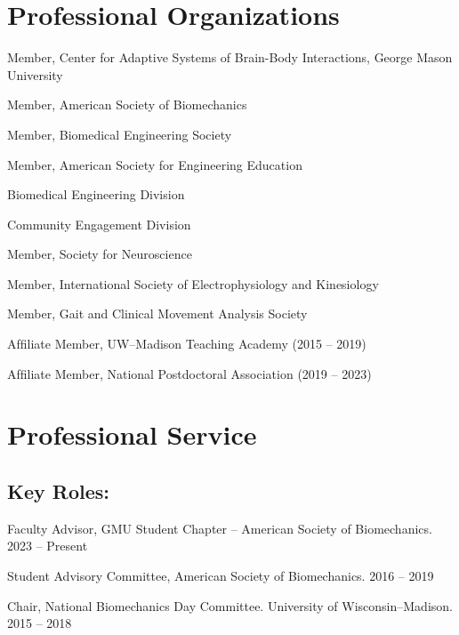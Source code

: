 \documentclass[letterpaper, 10pt]{article}
\begin{document}
\section{Professional Organizations}

\begin{compactitem} %
     \item Member, Center for Adaptive Systems of Brain-Body Interactions, George Mason University %
     \item Member, American Society of Biomechanics %
     \item Member, Biomedical Engineering Society %
     \item Member, American Society for Engineering Education %
          \begin{compactitem}
               \item Biomedical Engineering Division
               \item Community Engagement Division
          \end{compactitem}     
     \item Member, Society for Neuroscience %
     \item Member, International Society of Electrophysiology and Kinesiology %
     \item Member, Gait and Clinical Movement Analysis Society %
     \item Afﬁliate Member, UW--Madison Teaching Academy (2015 -- 2019)
     \item Afﬁliate Member, National Postdoctoral Association (2019 -- 2023)
\end{compactitem} %

\section{Professional Service}

\subsection{Key Roles:}
\begin{compactitem}
    \item Faculty Advisor, GMU Student Chapter -- American Society of Biomechanics. \hfill 2023 -- Present
    \item Student Advisory Committee, American Society of Biomechanics. \hfill 2016 -- 2019 %
    \item Chair, National Biomechanics Day Committee. University of Wisconsin--Madison. \hfill 2015 -- 2018
\end{compactitem}
\end{document}
